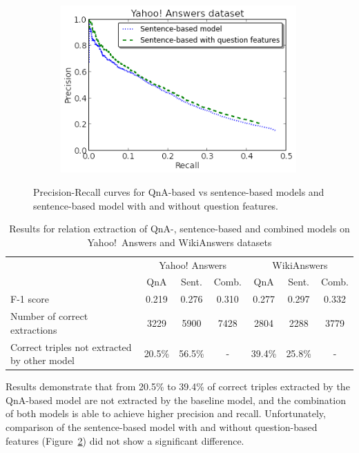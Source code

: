 \begin{figure}[h!]
\begin{subfigure}[h]{0.45\textwidth}
    \includegraphics[width=0.99\textwidth]{img/cqarelextract_noqf_vs_qf}
    \label{figure:factoid:cqarelextract:noqf_vs_qf}
\end{subfigure}
\caption{Precision-Recall curves for QnA-based vs sentence-based models and sentence-based model with and without question features.}
\label{figure:factoid:cqarelextract:pr_curve}
\end{figure}

\begin{table}
\centering
\small
\begin{tabular}{p{4.7cm}|ccc|ccc}
& \multicolumn{3}{c|}{Yahoo! Answers} & \multicolumn{3}{c}{WikiAnswers}\\
& QnA & Sent. & Comb. & QnA & Sent. & Comb.\\
\hline
F-1 score & 0.219 & 0.276 & 0.310 & 0.277 & 0.297 & 0.332\\
Number of correct extractions & 3229 & 5900 & 7428 & 2804 & 2288 & 3779 \\
Correct triples not extracted by other model & 20.5\% & 56.5\% & - & 39.4\% & 25.8\% & - \\
\end{tabular}
\caption{Results for relation extraction of QnA-, sentence-based and combined models on Yahoo!~Answers and WikiAnswers datasets}
\label{table:factoid:cqarelextract:results}
\end{table}

Results demonstrate that from 20.5\% to 39.4\% of correct triples extracted by the QnA-based model are not extracted by the baseline model, and the combination of both models is able to achieve higher precision and recall.
Unfortunately, comparison of the sentence-based model with and without question-based features (Figure~\ref{figure:factoid:cqarelextract:pr_curve}) did not show a significant difference.

